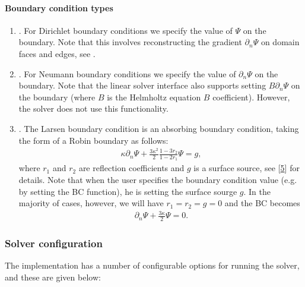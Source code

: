 \documentclass[letterpaper,10pt,english]{sphinxmanual}
\begin{document}
\paragraph{Boundary condition types}
\label{\detokenize{Solvers/RTE:boundary-condition-types}}\begin{enumerate}
%
\item {} 
.
For Dirichlet boundary conditions we specify the value of \(\Psi\) on the boundary.
Note that this involves reconstructing the gradient \(\partial_n\Psi\) on domain faces and edges, see .

\item {} 
.
For Neumann boundary conditions we specify the value of \(\partial_n\Psi\) on the boundary.
Note that the linear solver interface also supports setting \(B\partial_n\Psi\) on the boundary (where \(B\) is the Helmholtz equation \(B\) coefficient).
However, the  solver does not use this functionality.

\item {} 
.
The Larsen boundary condition is an absorbing boundary condition, taking the form of a Robin boundary as follows:
\begin{equation*}
\begin{split}\kappa\partial_n\Psi + \frac{3\kappa^2}{2}\frac{1-3r_2}{1-2r_1}\Psi = g,\end{split}
\end{equation*}
where \(r_1\) and \(r_2\) are reflection coefficients and \(g\) is a surface source, see {[}\hyperlink{cite.ZZReferences:id51}{5}{]} for details.
Note that when the user specifies the boundary condition value (e.g. by setting the BC function), he is setting the surface sourge \(g\).
In the majority of cases, however, we will have \(r_1 = r_2 = g = 0\) and the BC becomes
\begin{equation*}
\begin{split}\partial_n\Psi + \frac{3\kappa}{2}\Psi = 0.\end{split}
\end{equation*}
\end{enumerate}


\subsubsection{Solver configuration}
\label{\detokenize{Solvers/RTE:solver-configuration}}
The  implementation has a number of configurable options for running the solver, and these are given below:
\end{document}
